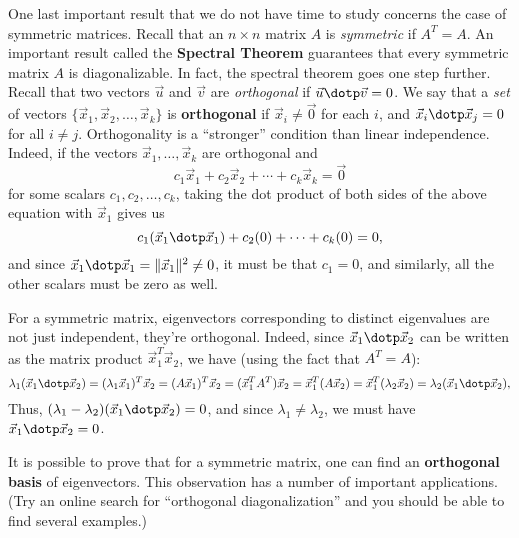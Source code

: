 \medskip

One last important result that we do not have time to study concerns the case of symmetric matrices. Recall that an $n\times n$ matrix $A$ is \textit{symmetric} if $A^T=A$. An important result called the \textbf{Spectral Theorem} guarantees that every symmetric matrix $A$ is diagonalizable. In fact, the spectral theorem goes one step further. Recall that two vectors $\vec{u}$ and $\vec{v}$ are \textit{orthogonal} if $\vec{u}\dotp\vec{v}=0$. We say that a \textit{set} of vectors $\{\vec{x}_1,\vec{x}_2,\ldots, \vec{x}_k\}$ is \textbf{orthogonal} if $\vec{x}_i\neq \vec{0}$ for each $i$, and $\vec{x}_i\dotp \vec{x}_j = 0$ for all $i\neq j$. Orthogonality is a ``stronger'' condition than linear independence. Indeed, if the vectors $\vec{x}_1,\ldots, \vec{x}_k$ are orthogonal and
\[
 c_1\vec{x}_1+c_2\vec{x}_2+\cdots + c_k\vec{x}_k = \vec{0}
\]
for some scalars $c_1,c_2,\ldots, c_k$, taking the dot product of both sides of the above equation with $\vec{x}_1$ gives us
\[
 c_1(\vec{x}_1\dotp \vec{x}_1)+c_2(0)+\cdots + c_k(0)=0,
\]
and since $\vec{x}_1\dotp \vec{x}_1 = \lVert \vec{x}_1\rVert^2 \neq 0$, it must be that $c_1=0$, and similarly, all the other scalars must be zero as well.

For a symmetric matrix, eigenvectors corresponding to distinct eigenvalues are not just independent, they're orthogonal. Indeed, since $\vec{x}_1\dotp \vec{x}_2$ can be written as the matrix product  $\vec{x}_1^T\vec{x}_2$, we have (using the fact that $A^T=A$):
\[
 \lambda_1(\vec{x}_1\dotp \vec{x}_2) = (\lambda_1\vec{x}_1)^T\vec{x}_2 = (A\vec{x}_1)^T\vec{x}_2 = (\vec{x}_1^TA^T)\vec{x}_2 = \vec{x}_1^T(A\vec{x}_2) = \vec{x}_1^T(\lambda_2\vec{x}_2) = \lambda_2(\vec{x}_1\dotp \vec{x}_2),
\]
Thus, $(\lambda_1-\lambda_2)(\vec{x}_1\dotp\vec{x}_2) = 0$, and since $\lambda_1\neq \lambda_2$, we must have $\vec{x}_1\dotp \vec{x}_2 = 0$.

It is possible to prove that for a symmetric matrix, one can find an \textbf{orthogonal basis} of eigenvectors. This observation has a number of important applications. (Try an online search for ``orthogonal diagonalization'' and you should be able to find several examples.)



